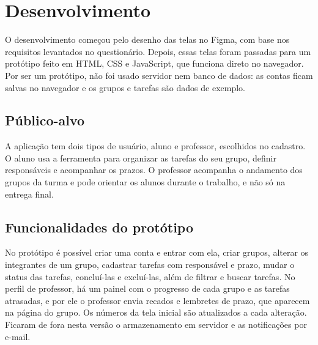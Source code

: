 \section{Desenvolvimento}

O desenvolvimento começou pelo desenho das telas no Figma, com base nos requisitos levantados no questionário. Depois, essas telas foram passadas para um protótipo feito em HTML, CSS e JavaScript, que funciona direto no navegador. Por ser um protótipo, não foi usado servidor nem banco de dados: as contas ficam salvas no navegador e os grupos e tarefas são dados de exemplo.

\subsection{Público-alvo}

A aplicação tem dois tipos de usuário, aluno e professor, escolhidos no cadastro. O aluno usa a ferramenta para organizar as tarefas do seu grupo, definir responsáveis e acompanhar os prazos. O professor acompanha o andamento dos grupos da turma e pode orientar os alunos durante o trabalho, e não só na entrega final.

\subsection{Funcionalidades do protótipo}

No protótipo é possível criar uma conta e entrar com ela, criar grupos, alterar os integrantes de um grupo, cadastrar tarefas com responsável e prazo, mudar o status das tarefas, concluí-las e excluí-las, além de filtrar e buscar tarefas. No perfil de professor, há um painel com o progresso de cada grupo e as tarefas atrasadas, e por ele o professor envia recados e lembretes de prazo, que aparecem na página do grupo. Os números da tela inicial são atualizados a cada alteração. Ficaram de fora nesta versão o armazenamento em servidor e as notificações por e-mail.
